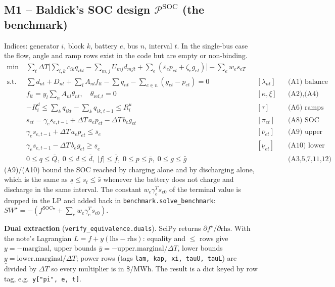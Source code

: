 \documentclass[10pt,a4paper]{article}
\newcommand{\code}[1]{\texttt{#1}}
\newcommand{\nuU}{\bar\nu}
\newcommand{\nuL}{\underline\nu}
\begin{document}
\subsection{M1 -- Baldick's SOC design $\mathcal P^{\text{SOC}}$ (the benchmark)}
\label{sec:soc}
Indices: generator $i$, block $k$, battery $e$, bus $n$, interval $t$. In the single-bus case the flow,
angle and ramp rows exist in the code but are empty or non-binding.
\begin{align*}
\min\;& \sum_t \Delta T\Big[\sum_{i,k} c_{ik} q_{ikt} - \sum_{m,j} U_{mj} d_{mjt}
       + \sum_e(\varepsilon_e p_{et} + \zeta_e g_{et})\Big] - \sum_e w_e s_{eT} \\
\text{s.t.}\;
& \textstyle\sum d_{nt} + D_{nt} + \sum_l A_{nl} f_{lt} - \sum q_{nt} - \sum_{e\in n}(g_{et} - p_{et}) = 0
  && [\lambda_{nt}] && \text{(A1) balance}\\
& f_{lt} = y_l \textstyle\sum_n A_{nl}\theta_{nt},\quad \theta_{\text{ref},t}=0 && [\kappa,\xi] && \text{(A2),(A4)}\\
& -R^d_i \le \textstyle\sum_k q_{ikt} - \sum_k q_{ik,t-1} \le R^u_i && [\tau] && \text{(A6) ramps}\\
& s_{et} = \gamma_e s_{e,t-1} + \Delta T\, a_e p_{et} - \Delta T\, b_e g_{et} && [\pi_{et}] && \text{(A8) SOC dynamics}\\
& \gamma_e s_{e,t-1} + \Delta T\, a_e p_{et} \le \bar s_e && [\nuU_{et}] && \text{(A9) upper SOC}\\
& \gamma_e s_{e,t-1} - \Delta T\, b_e g_{et} \ge \underline s_e && [\nuL_{et}] && \text{(A10) lower SOC}\\
& 0\le q\le \bar Q,\; 0\le d\le\bar d,\; |f|\le \bar f,\; 0\le p\le\bar p,\; 0\le g\le \bar g && && \text{(A3,5,7,11,12)}
\end{align*}
(A9)/(A10) bound the SOC reached by charging alone and by discharging alone, which is the same as
$\underline s\le s_t\le\bar s$ whenever the battery does not charge and discharge in the same interval.
The constant $w_e\gamma_e^T s_{e0}$ of the terminal value is dropped in the LP and added back in
\code{benchmark.solve\_benchmark}: $SW^\star = -(f^{\text{SOC}\star} + \sum_e w_e\gamma_e^T s_{e0})$.

\textbf{Dual extraction} (\code{verify\_equivalence.duals}). SciPy returns $\partial f^\star/\partial\text{rhs}$.
With the note's Lagrangian $L=f+y(\text{lhs}-\text{rhs})$: equality and $\le$ rows give $y=-\text{marginal}$,
upper bounds $\bar y = -\text{upper.marginal}/\Delta T$, lower bounds $\underline y=\text{lower.marginal}/\Delta T$;
power rows (tags \code{lam, kap, xi, tauU, tauL}) are divided by $\Delta T$ so every multiplier is in \$/MWh.
The result is a dict keyed by row tag, e.g.\ \code{y["pi", e, t]}.
\end{document}
